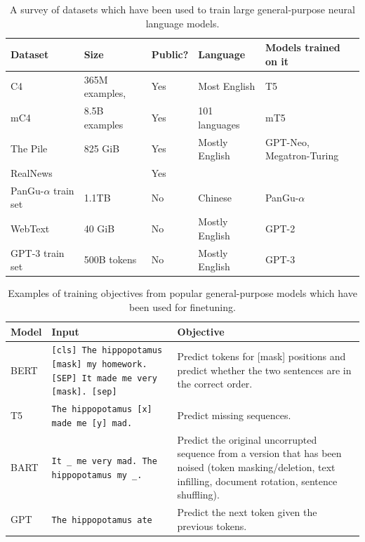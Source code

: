 \begin{itemize}
\begin{table}
  \centering
  \small
    \begin{tabular}{l|l|l|l|l}
    \toprule
    \textbf{Dataset} & \multicolumn{1}{l}{\textbf{Size}} & \multicolumn{1}{l}{\textbf{Public?}} & \textbf{Language} & \multicolumn{1}{l}{\textbf{Models trained on it}} \\
    \hline
    C4 \citep{raffel2019exploring}   &  365M examples,      & {Yes} & Most English & {T5} \\
    mC4 \citep{xue2020mt5}   &  8.5B examples  & {Yes} & 101 languages & {mT5} \\
    The Pile \citep{gao2020pile} & 825 GiB & {Yes} & Mostly English & {GPT-Neo, Megatron-Turing} \\
    RealNews &       & {Yes} &       \\
    PanGu-$\alpha$ train set & {1.1TB} & {No} & Chinese & {PanGu-$\alpha$} \\
    WebText &  40 GiB & {No} & Mostly English &  {GPT-2} \\
    GPT-3 train set & {500B tokens} & {No} & Mostly English & {GPT-3} \\
    \bottomrule
    \end{tabular}%
  \caption{A survey of datasets which have been used to train large general-purpose neural language models.}
  \label{tab:dataset_list}%
\end{table}%


\begin{table}
    \centering
    \small
	\begin{tabular}{l|p{2in}|p{2in}}
        \toprule 
        \textbf{Model} & \textbf{Input} & \textbf{Objective} \\
        \hline
        BERT \citep{devlin2018bert} & \texttt{[cls] The hippopotamus [mask] my homework. [SEP] It made me very [mask]. [sep]} &  Predict tokens for [mask] positions and predict whether the two sentences are in the correct order.\\
	\midrule
        T5 \citep{raffel2019exploring} & \texttt{The hippopotamus [x] made me [y] mad.} & Predict missing sequences.  \\
	\midrule
        BART & \texttt{It \_ me very mad. The hippopotamus my \_.} &  Predict the original uncorrupted sequence from a version that has been noised (token masking/deletion, text infilling, document rotation, sentence shuffling). \\
	\midrule
        GPT \citep{radford2019language,brown2020language} & \texttt{The hippopotamus ate} & Predict the next token given the previous tokens.\\
        \bottomrule
    \end{tabular}
    \caption{Examples of training objectives from popular general-purpose models which have been used for finetuning.}
    \label{tab:common_pretrained_models}
\end{table}


\end{itemize}
